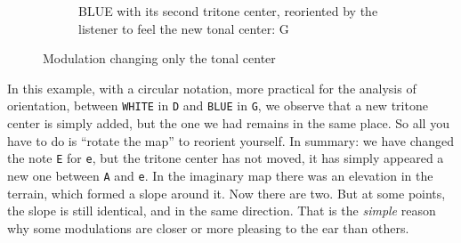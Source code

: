 \documentclass[]{report}
\begin{document}
\begin{figure}[H]
\begin{subfigure}{0.29\textwidth}
	\end{subfigure}
	\hfill
	\begin{subfigure}{0.29\textwidth}
		\centering
		\caption{\textsf{BLUE} with its second tritone center, reoriented by the listener to feel the new tonal center: \textsf{G}}
		\captionsetup{width=\textwidth}

	\end{subfigure}
	\hfill
	\caption{Modulation changing only the tonal center}\label{fig:modulation-changing-tonal-center}
\end{figure}
In this example, with a circular notation, more practical for the analysis of orientation, between \texttt{WHITE} in \texttt{D} and \texttt{BLUE} in \texttt{G}, we observe that a new tritone center is simply added, but the one we had remains in the same place. So all you have to do is ``rotate the map'' to reorient yourself.
In summary: we have changed the note \texttt{E} for \texttt{e}, but the tritone center has not moved, it has simply appeared a new one between \texttt{A} and \texttt{e}. In the imaginary map there was an elevation in the terrain, which formed a slope around it. Now there are two. But at some points, the slope is still identical, and in the same direction. That is the \emph{simple} reason why some modulations are closer or more pleasing to the ear than others.
\end{document}
